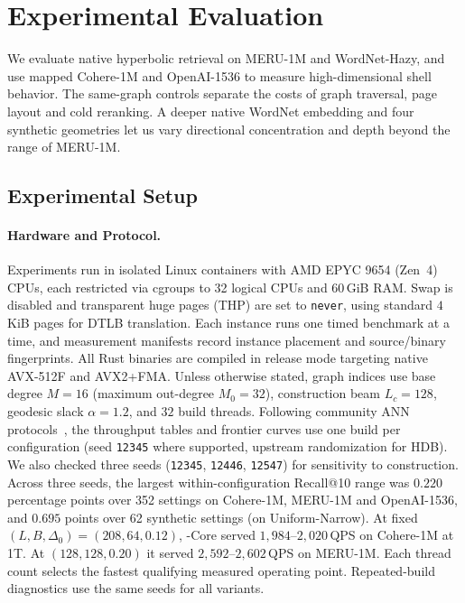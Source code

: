 \section{Experimental Evaluation}
\label{sec:eval}

We evaluate native hyperbolic retrieval on {MERU-1M} and {WordNet-Hazy}, and use mapped {Cohere-1M} and {OpenAI-1536} to measure high-dimensional shell behavior. The same-graph controls separate the costs of graph traversal, page layout and cold reranking. A deeper native {WordNet} embedding and four synthetic geometries let us vary directional concentration and depth beyond the range of {MERU-1M}.

\subsection{Experimental Setup}
\label{subsec:eval_setup}

\paragraph{Hardware and Protocol.}
Experiments run in isolated Linux containers with {AMD EPYC 9654} ({Zen~4}) CPUs, each restricted via cgroups to 32 logical CPUs and $60$\,GiB RAM. Swap is disabled and transparent huge pages ({THP}) are set to \texttt{never}, using standard $4$\,KiB pages for {DTLB} translation. Each instance runs one timed benchmark at a time, and measurement manifests record instance placement and source/binary fingerprints.
All Rust binaries are compiled in release mode targeting native {AVX-512F} and {AVX2+FMA}.
Unless otherwise stated, graph indices use base degree $M = 16$ (maximum out-degree $M_0 = 32$), construction beam $L_c = 128$, geodesic slack $\alpha = 1.2$, and $32$ build threads.
Following community {ANN} protocols~\cite{aumuller2020annbenchmarks,simhadri2022results}, the throughput tables and frontier curves use one build per configuration (seed \texttt{12345} where supported, upstream randomization for HDB). We also checked three seeds (\texttt{12345}, \texttt{12446}, \texttt{12547}) for sensitivity to construction.
Across three seeds, the largest within-configuration Recall@10 range was $0.220$ percentage points over 352 settings on {Cohere-1M}, {MERU-1M} and {OpenAI-1536}, and $0.695$ points over 62 synthetic settings (on {Uniform-Narrow}). At fixed $(L,B,\Delta_0)=(208,64,0.12)$, {\rquiver{}-Core} served $1{,}984$--$2{,}020$\,QPS on {Cohere-1M} at 1T. At $(128,128,0.20)$ it served $2{,}592$--$2{,}602$\,QPS on {MERU-1M}.
Each thread count selects the fastest qualifying measured operating point. Repeated-build diagnostics use the same seeds for all variants.

